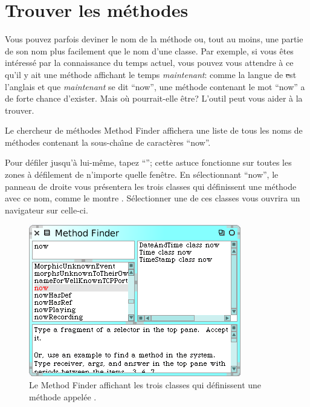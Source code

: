\documentclass[a4paper,10pt,twoside]{book}
\begin{document}
\section{Trouver les m\'ethodes}
\label{sec:quick:methodFinder}

Vous pouvez parfois deviner le nom de la m\'ethode ou, tout au moins,
une partie de son nom plus facilement que le nom d'une classe.
Par exemple, si vous \^etes int\'eress\'e par la connaissance du temps
actuel, vous pouvez vous attendre \`a ce qu'il y ait 
une m\'ethode affichant le temps \emph{maintenant}: comme la langue de \st
est l'anglais et que \emph{maintenant} se dit ``now'', une m\'ethode
contenant le mot ``now'' a de forte chance d'exister.
Mais o\`u pourrait-elle \^etre?
L'outil  peut vous aider \`a la trouver.

Le chercheur de m\'ethodes Method Finder affichera une liste de tous
les noms de m\'ethodes contenant la sous-cha\^{\i}ne de caract\`eres ``now''.  

Pour d\'efiler jusqu'\`a  lui-m\^eme, tapez ``''; cette
astuce fonctionne sur toutes les zones \`a d\'efilement de n'importe
quelle fen\^etre. En s\'electionnant ``now'', le panneau de droite
vous pr\'esentera les trois classes qui d\'efinissent une m\'ethode
avec ce nom, comme le montre .
S\'electionner une de ces classes vous ouvrira un navigateur sur
celle-ci.

\begin{figure}[hbt]
\centerline {\includegraphics[scale=0.7]{methodFinder-now}}
\caption{Le Method Finder affichant les trois classes qui
  d\'efinissent une m\'ethode appel\'ee .
\label{fig:MethodFinder}}
\end{figure}
\end{document}
